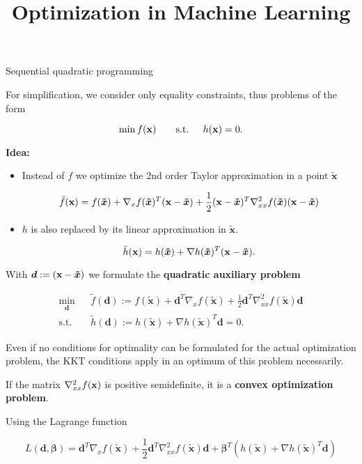\documentclass[11pt,compress,t,notes=noshow, xcolor=table]{beamer}
\title{Optimization in Machine Learning}
\date{}
\begin{document}
\lecture{\inserttitle}
\sloppy


\begin{vbframe}{Sequential quadratic programming}

For simplification, we consider only equality constraints, thus problems of the form

$$
\min f(\mathbf{x}) \qquad \text{s.t. } \quad h(\mathbf{x}) = 0.
$$

\textbf{Idea:}

\begin{itemize}
\item Instead of $f$ we optimize the 2nd order Taylor approximation in a point $\bm{\tilde x}$

$$
\tilde f(\mathbf{x}) = f(\bm{\tilde x}) +  \nabla_{x} f(\bm{\tilde x})^T (\mathbf{x}- \bm{\tilde x})+ \frac{1}{2} (\mathbf{x}- \bm{\tilde x})^T \nabla^2_{xx} f(\bm{\tilde x}) (\mathbf{x}- \bm{\tilde x})
$$

\item $h$ is also replaced by its linear approximation in $\bm{\tilde x}$.

$$
\tilde h(\mathbf{x}) = h(\bm{\tilde x}) + \nabla h(\bm{\tilde x})^T(\mathbf{x}- \bm{\tilde x}).
$$
\end{itemize}

\framebreak

With $\bm{d} := (\mathbf{x}- \bm{\tilde x})$ we formulate the \textbf{quadratic auxiliary problem}

\begin{eqnarray*}
\min_{\bm{d}} && \tilde f(\bm{d}) := f(\bm{\tilde x}) + \bm{d}^T \nabla_{x} f(\bm{\tilde x}) + \frac{1}{2} \bm{d}^T \nabla^2_{xx} f(\bm{\tilde x}) \bm{d} \\
\text{s.t. } && \tilde h(\bm{d}) :=  h(\bm{\tilde x}) + \nabla h(\bm{\tilde x})^T\bm{d} = 0.
\end{eqnarray*}

Even if no conditions for optimality can be formulated for the actual optimization problem, the KKT conditions apply in an optimum of this problem necessarily.

\lz

If the matrix $\nabla^2_{xx} f(\mathbf{x})$ is positive semidefinite, it is a \textbf{convex optimization problem}.

\framebreak

Using the Lagrange function

$$
L(\bm{d}, \bm{\beta}) = \bm{d}^T \nabla_{x} f(\bm{\tilde x}) + \frac{1}{2} \bm{d}^T \nabla^2_{xx} f(\bm{\tilde x}) \bm{d} + \bm{\beta}^T (h(\bm{\tilde x}) + \nabla h(\bm{\tilde x})^T\bm{d})
$$


\end{vbframe}
\end{document}
